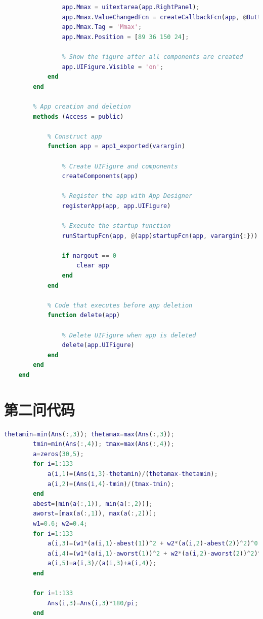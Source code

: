 \documentclass[withoutpreface,bwprint]{cumcmthesis} %
\begin{document}
\begin{appendices}
\begin{lstlisting}[language=matlab]
                % Create Mmax
                app.Mmax = uitextarea(app.RightPanel);
                app.Mmax.ValueChangedFcn = createCallbackFcn(app, @ButtonPushed, true);
                app.Mmax.Tag = 'Mmax';
                app.Mmax.Position = [89 36 150 24];
    
                % Show the figure after all components are created
                app.UIFigure.Visible = 'on';
            end
        end
    
        % App creation and deletion
        methods (Access = public)
    
            % Construct app
            function app = app1_exported(varargin)
    
                % Create UIFigure and components
                createComponents(app)
    
                % Register the app with App Designer
                registerApp(app, app.UIFigure)
    
                % Execute the startup function
                runStartupFcn(app, @(app)startupFcn(app, varargin{:}))
    
                if nargout == 0
                    clear app
                end
            end
    
            % Code that executes before app deletion
            function delete(app)
    
                % Delete UIFigure when app is deleted
                delete(app.UIFigure)
            end
        end
    end
     \end{lstlisting}
     \section{第二问代码}
     \begin{lstlisting}[language=matlab]
        thetamin=min(Ans(:,3)); thetamax=max(Ans(:,3));
        tmin=min(Ans(:,4)); tmax=max(Ans(:,4));
        a=zeros(30,5);
        for i=1:133
            a(i,1)=(Ans(i,3)-thetamin)/(thetamax-thetamin);
            a(i,2)=(Ans(i,4)-tmin)/(tmax-tmin);
        end
        abest=[min(a(:,1)), min(a(:,2))];
        aworst=[max(a(:,1)), max(a(:,2))];
        w1=0.6; w2=0.4;
        for i=1:133
            a(i,3)=(w1*(a(i,1)-abest(1))^2 + w2*(a(i,2)-abest(2))^2)^0.5;
            a(i,4)=(w1*(a(i,1)-aworst(1))^2 + w2*(a(i,2)-aworst(2))^2)^0.5;
            a(i,5)=a(i,3)/(a(i,3)+a(i,4));
        end
        
        for i=1:133
            Ans(i,3)=Ans(i,3)*180/pi;
        end
     \end{lstlisting}
\end{appendices}
\end{document}
